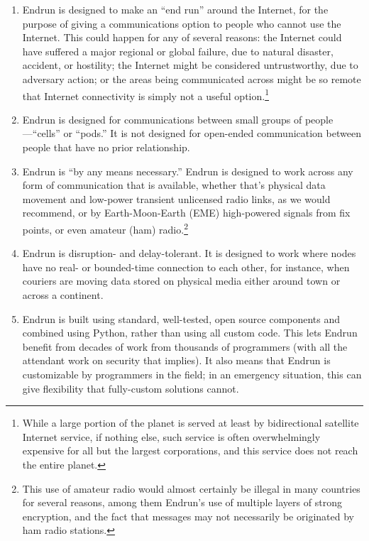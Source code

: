 \documentclass[12pt]{article}
\begin{document}
  \begin{enumerate}
    \item Endrun is designed to make an ``end run'' around the Internet, for the purpose of giving a communications option to people who cannot use the Internet. This could happen for any of several reasons: the Internet could have suffered a major regional or global failure, due to natural disaster, accident, or hostility; the Internet might be considered untrustworthy, due to adversary action; or the areas being communicated across might be so remote that Internet connectivity is simply not a useful option.\footnote{While a large portion of the planet is served at least by bidirectional satellite Internet service, if nothing else, such service is often overwhelmingly expensive for all but the largest corporations, and this service does not reach the entire planet.}
    
    \item Endrun is designed for communications between small groups of people---``cells'' or ``pods.'' It is not designed for open-ended communication between people that have no prior relationship.
    
    \item Endrun is ``by any means necessary.'' Endrun is designed to work across any form of communication that is available, whether that's physical data movement and low-power transient unlicensed radio links, as we would recommend, or by Earth-Moon-Earth (EME) high-powered signals from fix points, or even amateur (ham) radio.\footnote{This use of amateur radio would almost certainly be illegal in many countries for several reasons, among them Endrun's use of multiple layers of strong encryption, and the fact that messages may not necessarily be originated by ham radio stations.}
    
    \item Endrun is disruption- and delay-tolerant. It is designed to work where nodes have no real- or bounded-time connection to each other, for instance, when couriers are moving data stored on physical media either around town or across a continent.
    
    \item Endrun is built using standard, well-tested, open source components and combined using Python, rather than using all custom code. This lets Endrun benefit from decades of work from thousands of programmers (with all the attendant work on security that implies). It also means that Endrun is customizable by programmers in the field; in an emergency situation, this can give flexibility that fully-custom solutions cannot.
    
  \end{enumerate}
  
\end{document}
